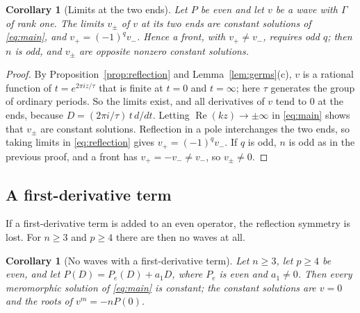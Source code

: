 \documentclass[11pt]{article}
\newtheorem{corollary}[theorem]{Corollary}
\theoremstyle{definition}
\theoremstyle{remark}
\numberwithin{equation}{section}
\begin{document}
\begin{corollary}[Limits at the two ends]\label{cor:ends}
Let \(P\) be even and let \(v\) be a wave with \(\Gamma\) of rank one.
The limits \(v_\pm\) of \(v\) at its two ends are constant solutions of
\eqref{eq:main}, and \(v_+=(-1)^qv_-\). Hence a front, with
\(v_+\ne v_-\), requires odd \(q\); then \(n\) is odd, and \(v_\pm\) are
opposite nonzero constant solutions.
\end{corollary}

\begin{proof}
By Proposition~\ref{prop:reflection} and Lemma~\ref{lem:germs}(c),
\(v\) is a rational function of \(t=e^{2\pi iz/\tau}\) that is finite
at \(t=0\) and \(t=\infty\);
here \(\tau\) generates the group of ordinary periods. So
the limits exist, and all derivatives of \(v\) tend to \(0\) at the
ends, because \(D=(2\pi i/\tau)\,t\,d/dt\). Letting
\(\operatorname{Re}(kz)\to\pm\infty\) in \eqref{eq:main} shows that
\(v_\pm\) are constant solutions. Reflection in a pole interchanges the
two ends, so taking limits in \eqref{eq:reflection} gives
\(v_+=(-1)^qv_-\). If \(q\) is odd, \(n\) is odd as in the previous
proof, and a front has \(v_+=-v_-\ne v_-\), so \(v_\pm\ne0\).
\end{proof}

\subsection{A first-derivative term}\label{sec:drift}

If a first-derivative term is added to an even operator, the
reflection symmetry is lost. For \(n\ge3\) and \(p\ge4\) there are then
no waves at all.

\begin{corollary}[No waves with a first-derivative term]\label{cor:drift}
Let \(n\ge3\), let \(p\ge4\) be even, and let \(P(D)=P_e(D)+a_1D\),
where \(P_e\) is even and \(a_1\ne0\). Then every meromorphic solution
of \eqref{eq:main} is constant; the constant solutions are \(v=0\) and
the roots of \(v^m=-nP(0)\).
\end{corollary}
\end{document}

